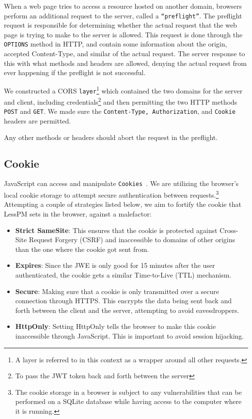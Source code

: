 When a web page tries to access a resource hosted on another domain, browsers
perform an additional request to the server, called a \texttt{``preflight''}.
The preflight request is responsible for determining whether the actual
request that the web page is trying to make to the server is allowed.
This request is done through the \texttt{OPTIONS} method in HTTP, and contain
some information about the origin, accepted Content-Type, and similar of the
actual request.
The server response to this with what methods and headers are allowed,
denying the actual request from ever happening if the preflight is not
successful.

We constructed a CORS \texttt{layer}\footnote{
  A layer is referred to in this context as a wrapper around all other requests.
} which contained the two domains for the server and client, including
credentials\footnote{
  To pass the JWT token back and forth between the server
} and then permitting the two HTTP methods \texttt{POST} and \texttt{GET}.
We made sure the \texttt{Content-Type, Authorization}, and \texttt{Cookie}
headers are permitted.

Any other methods or headers should abort the request in the preflight.

\subsection{Cookie}\label{subsec:cookie}
JavaScript can access and manipulate \texttt{Cookies}~\cite{he2019malicious}.
We are utilizing the browser's local cookie storage to attempt secure
authentication between requests.\footnote{
  The cookie storage in a browser is subject to any vulnerabilities that can
  be performed on a SQLite database while having access to the computer where
  it is running.
}
Attempting a couple of strategies listed below, we aim to fortify the cookie
that LessPM sets in the browser, against a malefactor:
\begin{itemize}
  \item \textbf{Strict SameSite}:
  This ensures that the cookie is protected against Cross-Site Request
  Forgery (CSRF) and inaccessible to domains of other origins than the one
  where the cookie got sent from.
  \item \textbf{Expires}:
  Since the JWE is only good for 15 minutes after the user authenticated, the
  cookie gets a similar Time-to-Live (TTL) mechanism.
  \item \textbf{Secure}:
  Making sure that a cookie is only transmitted over a secure connection
  through HTTPS\@.
  This encrypts the data being sent back and forth between the client and
  the server, attempting to avoid eavesdroppers.
  \item \textbf{HttpOnly}:
  Setting HttpOnly tells the browser to make this cookie inaccessible through
  JavaScript.
  This is important to avoid session hijacking.
\end{itemize}


